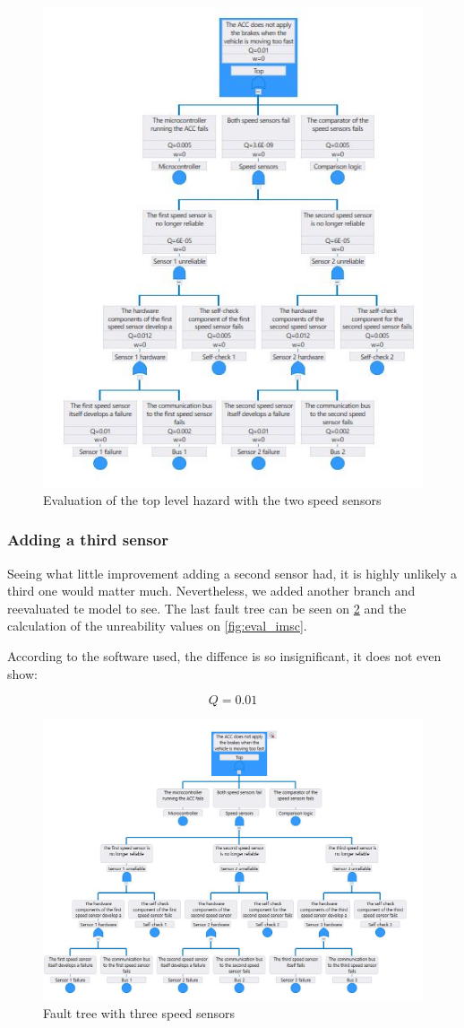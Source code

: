 \documentclass[a4paper]{article}
\begin{document}
\begin{figure}
	\centering
	\includegraphics[width=.5\textwidth]{eval_extended.jpg}
	\caption{Evaluation of the top level hazard with the two speed sensors}%
	\label{fig:eval_extended}
\end{figure}


\subsubsection{Adding a third sensor}

Seeing what little improvement adding a second sensor had, it is highly unlikely
a third one would matter much. Nevertheless, we added another branch and
reevaluated te model to see. The last fault tree can be seen on
\cref{fig:fault_tree_imsc} and the calculation of the unreability values on
\cref{fig:eval_imsc}.

According to the software used, the diffence is so insignificant, it does not
even show:

\[ Q = 0.01 \]

\begin{figure}
	\centering
	\includegraphics[width=\textwidth]{fault_tree_imsc.jpg}
	\caption{Fault tree with three speed sensors}%
	\label{fig:fault_tree_imsc}
\end{figure}
\end{document}
